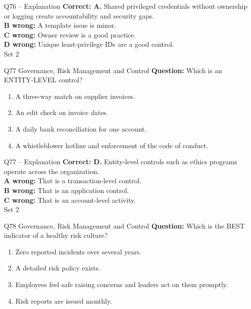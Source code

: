 \documentclass[aspectratio=169,10pt]{beamer}
\begin{document}
\begin{frame}[t]{Q76 -- Explanation}
	\footnotesize
	\textbf{Correct: A.} Shared privileged credentials without ownership or logging create accountability and security gaps. \\[5pt]
\textbf{B wrong:} A template issue is minor. \\[3pt]
\textbf{C wrong:} Owner review is a good practice. \\[3pt]
\textbf{D wrong:} Unique least-privilege IDs are a good control. \\[3pt]
	\vfill {\tiny Set 2}
\end{frame}

\begin{frame}[t]{Q77 \hfill {\scriptsize Governance, Risk Management and Control}}
	\small
	\textbf{Question:} Which is an ENTITY-LEVEL control?
	\begin{enumerate}[label=\Alph*.,itemsep=1pt,topsep=3pt]
			\item A three-way match on supplier invoices.
			\item An edit check on invoice dates.
			\item A daily bank reconciliation for one account.
			\item A whistleblower hotline and enforcement of the code of conduct.
	\end{enumerate}
\end{frame}

\begin{frame}[t]{Q77 -- Explanation}
	\footnotesize
	\textbf{Correct: D.} Entity-level controls such as ethics programs operate across the organization. \\[5pt]
\textbf{A wrong:} That is a transaction-level control. \\[3pt]
\textbf{B wrong:} That is an application control. \\[3pt]
\textbf{C wrong:} That is an account-level activity. \\[3pt]
	\vfill {\tiny Set 2}
\end{frame}

\begin{frame}[t]{Q78 \hfill {\scriptsize Governance, Risk Management and Control}}
	\small
	\textbf{Question:} Which is the BEST indicator of a healthy risk culture?
	\begin{enumerate}[label=\Alph*.,itemsep=1pt,topsep=3pt]
			\item Zero reported incidents over several years.
			\item A detailed risk policy exists.
			\item Employees feel safe raising concerns and leaders act on them promptly.
			\item Risk reports are issued monthly.
	\end{enumerate}
\end{frame}
\end{document}
